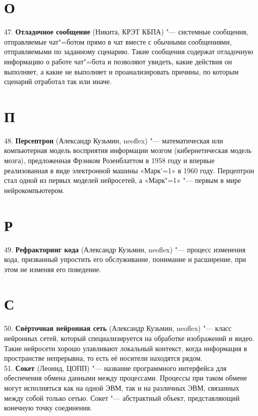 \documentclass[14 pt]{extarticle}
\begin{document}
\section*{О}
    47. \textbf{Отладочное сообщение} (Никита, КРЭТ КБПА)  "--- системные сообщения, отправляемые чат"=ботом прямо в чат вместе с обычными сообщениями, отправляемыми по заданному сценарию. Такие сообщения содержат отладочную информацию о работе чат"=бота и позволяют увидеть, какие действия он выполняет, а какие не выполняет и проанализировать причины, по которым сценарий отработал так или иначе. \\
    
\section*{П}
    48. \textbf{Персептрон} (Александр Кузьмин, neoflex) "--- математическая или компьютерная модель восприятия информации мозгом (кибернетическая модель мозга), предложенная Фрэнком Розенблаттом в 1958 году и впервые реализованная в виде электронной машины «Марк'=1» в 1960 году. Перцептрон стал одной из первых моделей нейросетей, а «Марк"=1» "--- первым в мире нейрокомпьютером. \\
    
\section*{Р}
    49. \textbf{Рефракторинг кода} (Александр Кузьмин, neoflex) "--- процесс изменения кода, призванный упростить его обслуживание, понимание и расширение, при этом не изменяя его поведение. \\
    
\section*{С}
    50. \textbf{Свёрточная нейронная сеть} (Александр Кузьмин, neoflex) "--- класс нейронных сетей, который специализируется на обработке изображений и видео. Такие нейросети хорошо улавливают локальный контекст, когда информация в пространстве непрерывна, то есть её носители находятся рядом. \\
    
    51. \textbf{Сокет} (Леонид, ЦОПП) "--- название программного интерфейса для обеспечения обмена данными между процессами. Процессы при таком обмене могут исполняться как на одной ЭВМ, так и на различных ЭВМ, связанных между собой только сетью. Сокет "--- абстрактный объект, представляющий конечную точку соединения. \\
    
\end{document}
